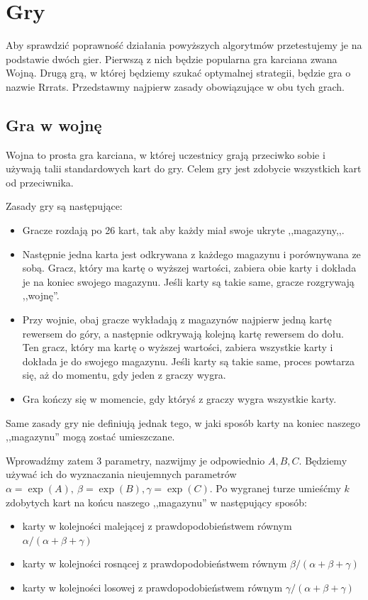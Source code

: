 \documentclass[inzynierska]{pwr_wmat_praca_dyplomowa}
\theoremstyle{plain}
\numberwithin{theorem}{chapter}
\theoremstyle{definition}
\numberwithin{theorem}{chapter}
\begin{document}
	\chapter{Gry}
	Aby sprawdzić poprawność działania powyższych algorytmów przetestujemy je na podstawie dwóch gier. Pierwszą z nich będzie popularna gra karciana zwana Wojną. Drugą grą, w której będziemy szukać optymalnej strategii, będzie gra o nazwie Rrrats. Przedstawmy najpierw zasady obowiązujące w obu tych grach.

	\section{Gra w wojnę}
	Wojna to prosta gra karciana, w której uczestnicy grają przeciwko sobie i używają talii standardowych kart do gry. Celem gry jest zdobycie wszystkich kart od przeciwnika.
	
	Zasady gry są następujące:
	\begin{itemize}
		\item 	Gracze rozdają po 26 kart, tak aby każdy miał swoje ukryte ,,magazyny,,.
		
		\item Następnie jedna karta jest odkrywana z każdego magazynu i porównywana ze sobą. Gracz, który ma kartę o wyższej wartości, zabiera obie karty i dokłada je na koniec swojego magazynu. Jeśli karty są takie same, gracze rozgrywają ,,wojnę''.
		
		\item Przy wojnie, obaj gracze wykładają z magazynów najpierw jedną kartę rewersem do góry, a następnie odkrywają kolejną kartę rewersem do dołu. Ten gracz, który ma kartę o wyższej wartości, zabiera wszystkie karty i dokłada je do swojego magazynu. Jeśli karty są takie same, proces powtarza się, aż do momentu, gdy jeden z graczy wygra.
		
		\item Gra kończy się w momencie, gdy któryś z graczy wygra wszystkie karty.
	\end{itemize}
	Same zasady gry nie definiują jednak tego, w jaki sposób karty na koniec naszego ,,magazynu'' mogą zostać umieszczane.
	
	Wprowadźmy zatem 3 parametry, nazwijmy je odpowiednio $A, B, C$. Będziemy używać ich do wyznaczania nieujemnych parametrów $\alpha = \exp(A), \
	\beta= \exp(B), \gamma= \exp(C)$. Po wygranej turze umieśćmy $k$ zdobytych kart na końcu naszego ,,magazynu'' w następujący sposób:
	\begin{itemize}
		\item karty w kolejności malejącej z prawdopodobieństwem równym $\alpha/(\alpha+\beta+\gamma)$ 
		
		\item karty w kolejności rosnącej z prawdopodobieństwem równym $\beta/(\alpha+\beta+\gamma)$ 
		
		\item karty w kolejności losowej z prawdopodobieństwem równym $\gamma/(\alpha+\beta+\gamma)$ 
	\end{itemize}
	
\end{document}
